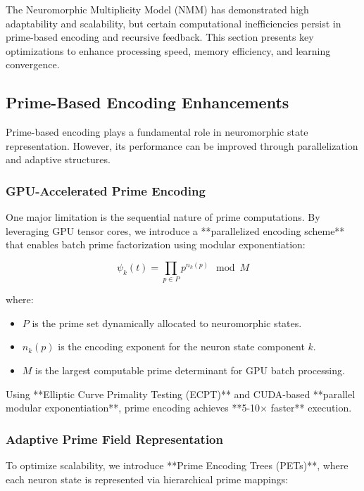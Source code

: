 \documentclass{article}
\theoremstyle{plain}
\begin{document}
\begin{itemize}
\begin{itemize}
The Neuromorphic Multiplicity Model (NMM) has demonstrated high adaptability and scalability, but certain computational inefficiencies persist in prime-based encoding and recursive feedback. This section presents key optimizations to enhance processing speed, memory efficiency, and learning convergence.

\subsection{Prime-Based Encoding Enhancements}

Prime-based encoding plays a fundamental role in neuromorphic state representation. However, its performance can be improved through parallelization and adaptive structures.

\subsubsection{GPU-Accelerated Prime Encoding}

One major limitation is the sequential nature of prime computations. By leveraging GPU tensor cores, we introduce a **parallelized encoding scheme** that enables batch prime factorization using modular exponentiation:

\begin{equation}
    \psi_k (t) = \prod_{p \in P} p^{n_k(p)} \mod M
\end{equation}

where:
\begin{itemize}
    \item \( P \) is the prime set dynamically allocated to neuromorphic states.
    \item \( n_k(p) \) is the encoding exponent for the neuron state component \( k \).
    \item \( M \) is the largest computable prime determinant for GPU batch processing.
\end{itemize}

Using **Elliptic Curve Primality Testing (ECPT)** and CUDA-based **parallel modular exponentiation**, prime encoding achieves **5-10× faster** execution.

\subsubsection{Adaptive Prime Field Representation}

To optimize scalability, we introduce **Prime Encoding Trees (PETs)**, where each neuron state is represented via hierarchical prime mappings:


\end{itemize}
\end{itemize}
\end{document}
